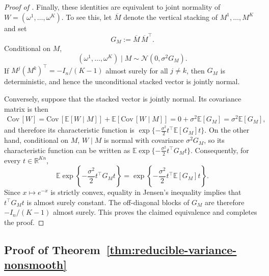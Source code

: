 \documentclass[12pt]{article}
\DeclareMathOperator{\Cov}{Cov}
\def\E{\mathbb{E}}
\def\Cov{{\textrm{Cov}}\,}
\def\calN{\mathcal{N}}
\newcommand{\tran}{^\intercal}
\theoremstyle{general}
\begin{document}
\begin{proof}[Proof of ]
Finally, these identities are equivalent to
joint normality of $W=(\omega^1,\ldots,\omega^K)$. To see this, let
$\overline M$ denote the vertical stacking of $M^1,\ldots,M^K$ and set
\[
G_M:=\overline M\,\overline M\tran.
\]
Conditional on $M$,
\[
(\omega^1,\ldots,\omega^K)\mid M
\sim
\calN(0,\sigma^2G_M).
\]
If
$M^j(M^k)\tran=-I_n/(K-1)$ almost surely for all $j\neq k$, then
$G_M$ is deterministic, and hence the unconditional stacked vector is
jointly normal.

Conversely, suppose that the stacked vector is jointly normal.
Its covariance matrix is then
\begin{align*}
    \Cov[W] = \Cov[\E[W\mid M]] + \E[\Cov[W\mid M]] = 0 + \sigma^2 \E[G_M] = \sigma^2 \E[G_M],
\end{align*}
and therefore its characteristic function is $\exp\{-\frac{\sigma^2}{2}t\tran\mathbb E[G_M]t \}$.
On the other hand, conditional on $M$, $W\mid M$ is normal with covariance $\sigma^2 G_M$, so its characteristic function can be written as $\mathbb E\exp\{-\frac{\sigma^2}{2}t\tran G_Mt\}$.
Consequently, for every $t\in\mathbb R^{Kn}$,
\[
\mathbb E\exp\left\{
-\frac{\sigma^2}{2}t\tran G_Mt
\right\}
=
\exp\left\{
-\frac{\sigma^2}{2}t\tran\mathbb E[G_M]t
\right\}.
\]
Since $x\mapsto e^{-x}$ is strictly convex, equality in Jensen's
inequality implies that $t\tran G_Mt$ is almost surely constant.
The off-diagonal blocks of $G_M$ are therefore
$-I_n/(K-1)$ almost surely. This proves the claimed equivalence and
completes the proof.
\end{proof}

\subsection{Proof of Theorem~\ref{thm:reducible-variance-nonsmooth}}
\label{prf:thm:reducible-variance-nonsmooth}
\end{document}
